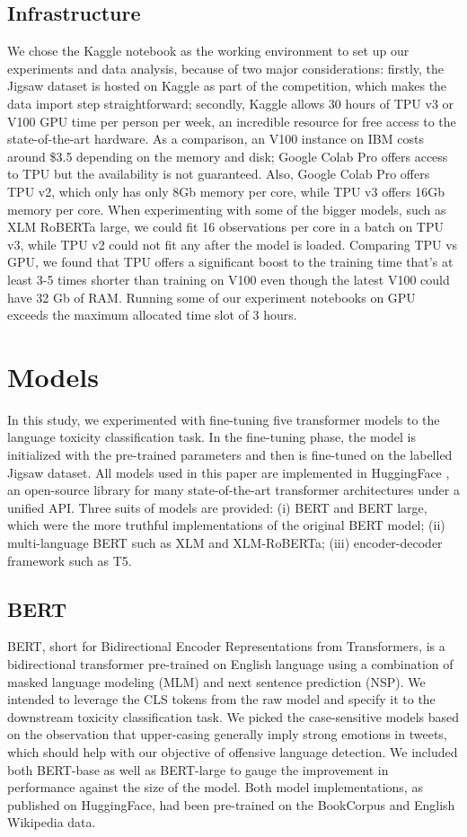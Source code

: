 \documentclass[11pt,a4paper]{article}
\begin{document}
\subsection{Infrastructure}
We chose the Kaggle notebook as the working environment to set up our experiments and data analysis, because of two major considerations: firstly, the Jigsaw dataset is hosted on Kaggle as part of the competition, which makes the data import step straightforward; secondly, Kaggle allows 30 hours of TPU v3 or V100 GPU time per person per week, an incredible resource for free access to the state-of-the-art hardware. As a comparison, an V100 instance on IBM costs around \$3.5 depending on the memory and disk; Google Colab Pro offers access to TPU but the availability is not guaranteed. Also, Google Colab Pro offers TPU v2, which only has only 8Gb memory per core, while TPU v3 offers 16Gb memory per core. When experimenting with some of the bigger models, such as XLM RoBERTa large, we could fit 16 observations per core in a batch on TPU v3, while TPU v2 could not fit any after the model is loaded. Comparing TPU vs GPU, we found that TPU offers a significant boost to the training time that’s at least 3-5 times shorter than training on V100 even though the latest V100 could have 32 Gb of RAM. Running some of our experiment notebooks on GPU exceeds the maximum allocated time slot of 3 hours. 

\section{Models}
In this study, we experimented with fine-tuning five transformer models to the language toxicity classification task. In the fine-tuning phase, the model is initialized with the pre-trained parameters and then is fine-tuned on the labelled Jigsaw dataset. All models used in this paper are implemented in HuggingFace \citep{wolf2019huggingfaces}, an open-source library for many state-of-the-art transformer architectures under a unified API. Three suits of models are provided: (i) BERT and BERT large, which were the more truthful implementations of the original BERT model; (ii) multi-language BERT such as XLM and XLM-RoBERTa; (iii) encoder-decoder framework such as T5. 

\subsection{BERT}
BERT, short for Bidirectional Encoder Representations from Transformers, is a bidirectional transformer pre-trained on English language using a combination of masked language modeling (MLM) and next sentence prediction (NSP). We intended to leverage the CLS tokens from the raw model and specify it to the downstream toxicity classification task. We picked the case-sensitive models based on the observation that upper-casing generally imply strong emotions in tweets, which should help with our objective of offensive language detection. We included both BERT-base as well as BERT-large to gauge the improvement in performance against the size of the model. Both model implementations, as published on HuggingFace, had been pre-trained on the BookCorpus and English Wikipedia data.
\end{document}
